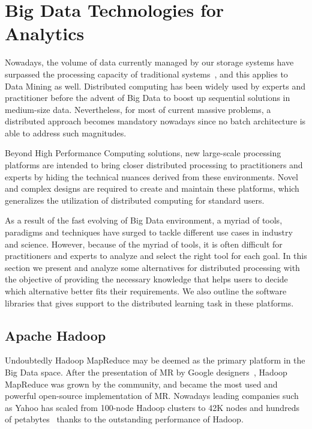 \documentclass[3p,review]{elsarticle}
\begin{document}
\section{Big Data Technologies for Analytics}\label{sec:techno}


Nowadays, the volume of data currently managed by our storage systems have surpassed the processing capacity of traditional systems~\cite{wu14}, and this applies to Data Mining as well. Distributed computing has been widely used by experts and practitioner before the advent of Big Data to boost up sequential solutions in medium-size data. Nevertheless, for most of current massive problems, a distributed approach becomes mandatory nowadays since no batch architecture is able to address such magnitudes.

Beyond High Performance Computing solutions, new large-scale processing platforms are intended to bring closer distributed processing to practitioners and experts by hiding the technical nuances derived from these environments. Novel and complex designs are required to create and maintain these platforms, which generalizes the utilization of distributed computing for standard users. 

As a result of the fast evolving of Big Data environment, a myriad of tools, paradigms and techniques have surged to tackle different use cases in industry and science. However, because of the myriad of tools, it is often difficult for practitioners and experts to analyze and select the right tool for each goal. In this section we present and analyze some alternatives for distributed processing with the objective of providing the necessary knowledge that helps users to decide which alternative better fits their requirements. We also outline the software libraries that gives support to the distributed learning task in these platforms.

\subsection{Apache Hadoop}\label{subsec:hadoop}

Undoubtedly Hadoop MapReduce may be deemed as the primary platform in the Big Data space. After the presentation of MR by Google designers~\cite{dean04}, Hadoop MapReduce was grown by the community, and became the most used and powerful open-source implementation of MR. Nowadays leading companies such as Yahoo has scaled from 100-node Hadoop clusters to 42K nodes and hundreds of petabytes~\cite{harris13} thanks to the outstanding performance of Hadoop. 
\end{document}

